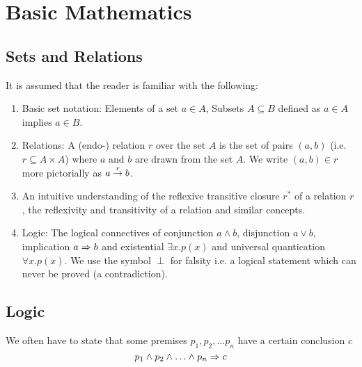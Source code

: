 \section{Basic Mathematics}


\begin{comment}
    - Logic:
        - Rule notation
        - Universal quantification

    - Inductive Sets
\end{comment}



\subsection{Sets and Relations}

It is assumed that the reader is familiar with the following:

\begin{enumerate}

\item Basic set notation: Elements of a set $a \in A$, Subsets $A \subseteq B$
defined as $a \in A$ implies $a \in B$.

\item Relations: A (endo-) relation $r$ over the set $A$ is the set of pairs
$(a,b)$ (i.e. $r \subseteq A \times A$) where $a$ and $b$ are drawn from the set
$A$. We write $(a,b) \in r$ more pictorially as $a \stackrel{r}{\to} b$.

\item An intuitive understanding of the reflexive transitive closure $r^*$ of
a relation $r$, the reflexivity and transitivity of a relation and similar
concepts.

\item Logic: The logical connectives of conjunction $a \land b$, disjunction $a
\lor b$, implication $a \Rightarrow b$ and existential $\exists x. p(x)$ and universal
quantication $\forall x.p(x)$. We use the symbol $\perp$ for falsity i.e. a
logical statement which can never be proved (a contradiction).
\end{enumerate}





\subsection{Logic}

We often have to state that some premises $p_1, p_2, \ldots p_n$ have a certain
conclusion $c$
$$
p_1 \land p_2 \land \ldots \land p_n \Rightarrow c
$$

